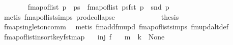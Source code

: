 \begin{isabellebody}
\ \ \ \ \ \ \isamarkupfalse%
\ {\isachardoublequoteopen}fmap{\isacharunderscore}{\kern0pt}of{\isacharunderscore}{\kern0pt}list\ {\isacharparenleft}{\kern0pt}p\ {\isacharhash}{\kern0pt}\ ps{\isacharparenright}{\kern0pt}\ {\isacharequal}{\kern0pt}\ {\isacharparenleft}{\kern0pt}fmap{\isacharunderscore}{\kern0pt}of{\isacharunderscore}{\kern0pt}list\ ps{\isacharparenright}{\kern0pt}{\isacharparenleft}{\kern0pt}fst\ p\ {\isachardollar}{\kern0pt}{\isachardollar}{\kern0pt}{\isacharcolon}{\kern0pt}{\isacharequal}{\kern0pt}\ snd\ p{\isacharparenright}{\kern0pt}{\isachardoublequoteclose}\isanewline
\ \ \ \ \ \ \ \ \isamarkupfalse%
\ {\isacharparenleft}{\kern0pt}metis\ fmap{\isacharunderscore}{\kern0pt}of{\isacharunderscore}{\kern0pt}list{\isacharunderscore}{\kern0pt}simps{\isacharparenleft}{\kern0pt}{}{\isacharparenright}{\kern0pt}\ prod{\isachardot}{\kern0pt}collapse{\isacharparenright}{\kern0pt}\isanewline
\ \ \ \ \ \ \isamarkupfalse%
\ {\isacharasterisk}{\kern0pt}\ \ {\isacharasterisk}{\kern0pt}{\isacharasterisk}{\kern0pt}\ \isamarkupfalse%
\ {\isacharquery}{\kern0pt}thesis\isanewline
\ \ \ \ \ \ \ \ \isamarkupfalse%
\ fmap{\isacharunderscore}{\kern0pt}singleton{\isacharunderscore}{\kern0pt}comm\ \isamarkupfalse%
\ {\isacharparenleft}{\kern0pt}metis\ fmadd{\isacharunderscore}{\kern0pt}fmupd\ fmap{\isacharunderscore}{\kern0pt}of{\isacharunderscore}{\kern0pt}list{\isacharunderscore}{\kern0pt}simps{\isacharparenleft}{\kern0pt}{}{\isacharcomma}{\kern0pt}{}{\isacharparenright}{\kern0pt}\ fmupd{\isacharunderscore}{\kern0pt}alt{\isacharunderscore}{\kern0pt}def{\isacharparenright}{\kern0pt}\isanewline
\ \ \ \ \isamarkupfalse%
\isanewline
\ \ \isamarkupfalse%
\isanewline
{}\isamarkupfalse%
%
\endisatagproof
{\isafoldproof}%
%
\isadelimproof
\isanewline
%
\endisadelimproof
\isanewline
{}\isamarkupfalse%
\ fmap{\isacharunderscore}{\kern0pt}of{\isacharunderscore}{\kern0pt}list{\isacharunderscore}{\kern0pt}insort{\isacharunderscore}{\kern0pt}key{\isacharunderscore}{\kern0pt}fst{\isacharunderscore}{\kern0pt}map{\isacharcolon}{\kern0pt}\isanewline
\ \ \ {\isachardoublequoteopen}inj\ f{\isachardoublequoteclose}\isanewline
\ \ \ {\isachardoublequoteopen}m\ {\isachardollar}{\kern0pt}{\isachardollar}{\kern0pt}\ k\ {\isacharequal}{\kern0pt}\ None{\isachardoublequoteclose}\isanewline

\end{isabellebody}
